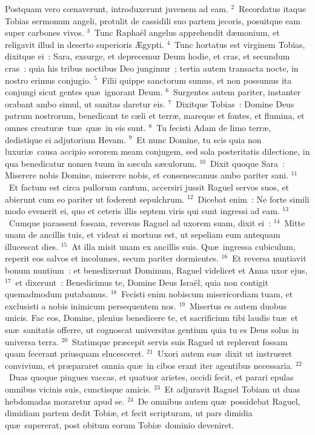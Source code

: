 \lettrine[lines=10,image=true,loversize=0.05,lraise=-0.03]{P}{}ostquam vero cœnaverunt, introduxerunt juvenem ad eam.
${}^{2}$~Recordatus itaque Tobias sermonum angeli, protulit de cassidili suo partem jecoris, posuitque eam super carbones vivos.
${}^{3}$~Tunc Rapha\"el angelus apprehendit d\ae monium, et religavit illud in deserto superioris \AE gypti.
${}^{4}$~Tunc hortatus est virginem Tobias, dixitque ei~: Sara, exsurge, et deprecemur Deum hodie, et cras, et secundum cras~: quia his tribus noctibus Deo jungimur~; tertia autem transacta nocte, in nostro erimus conjugio.
${}^{5}$~Filii quippe sanctorum sumus, et non possumus ita conjungi sicut gentes qu\ae\ ignorant Deum.
${}^{6}$~Surgentes autem pariter, instanter orabant ambo simul, ut sanitas daretur eis.
${}^{7}$~Dixitque Tobias~: Domine Deus patrum nostrorum, benedicant te c\ae li et terr\ae , mareque et fontes, et flumina, et omnes creatur\ae\ tu\ae\ qu\ae\ in eis sunt.
${}^{8}$~Tu fecisti Adam de limo terr\ae , dedistique ei adjutorium Hevam.
${}^{9}$~Et nunc Domine, tu scis quia non luxuri\ae\ causa accipio sororem meam conjugem, sed sola posteritatis dilectione, in qua benedicatur nomen tuum in s\ae cula s\ae culorum.
${}^{10}$~Dixit quoque Sara~: Miserere nobis Domine, miserere nobis, et consenescamus ambo pariter sani.
${}^{11}$~Et factum est circa pullorum cantum, accersiri jussit Raguel servos suos, et abierunt cum eo pariter ut foderent sepulchrum.
${}^{12}$~Dicebat enim~: Ne forte simili modo evenerit ei, quo et ceteris illis septem viris qui sunt ingressi ad eam.
${}^{13}$~Cumque parassent fossam, reversus Raguel ad uxorem suam, dixit ei~:
${}^{14}$~Mitte unam de ancillis tuis, et videat si mortuus est, ut sepeliam eum antequam illucescat dies.
${}^{15}$~At illa misit unam ex ancillis suis. Qu\ae\ ingressa cubiculum, reperit eos salvos et incolumes, secum pariter dormientes.
${}^{16}$~Et reversa nuntiavit bonum nuntium~: et benedixerunt Dominum, Raguel videlicet et Anna uxor ejus,
${}^{17}$~et dixerunt~: Benedicimus te, Domine Deus Isra\"el, quia non contigit quemadmodum putabamus.
${}^{18}$~Fecisti enim nobiscum misericordiam tuam, et exclusisti a nobis inimicum persequentem nos.
${}^{19}$~Misertus es autem duobus unicis. Fac eos, Domine, plenius benedicere te, et sacrificium tibi laudis tu\ae\ et su\ae\ sanitatis offerre, ut cognoscat universitas gentium quia tu es Deus solus in universa terra.
${}^{20}$~Statimque pr\ae cepit servis suis Raguel ut replerent fossam quam fecerant priusquam elucesceret.
${}^{21}$~Uxori autem su\ae\ dixit ut instrueret convivium, et pr\ae pararet omnia qu\ae\ in cibos erant iter agentibus necessaria.
${}^{22}$~Duas quoque pingues vaccas, et quatuor arietes, occidi fecit, et parari epulas omnibus vicinis suis, cunctisque amicis.
${}^{23}$~Et adjuravit Raguel Tobiam ut duas hebdomadas moraretur apud se.
${}^{24}$~De omnibus autem qu\ae\ possidebat Raguel, dimidiam partem dedit Tobi\ae , et fecit scripturam, ut pars dimidia qu\ae\ supererat, post obitum eorum Tobi\ae\ dominio deveniret.

